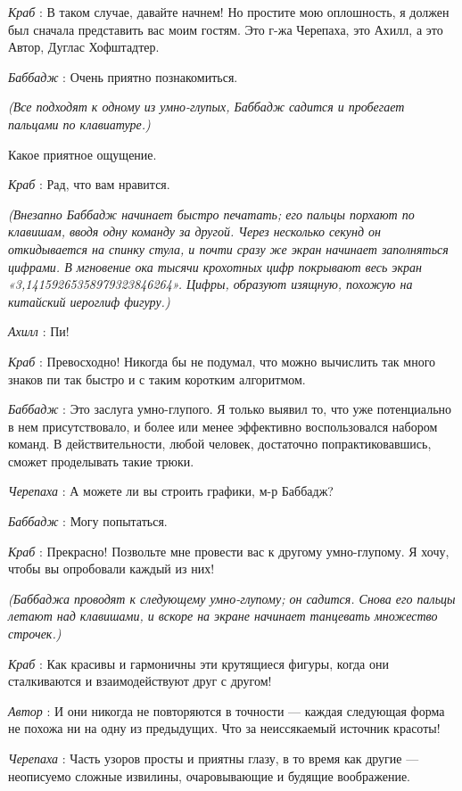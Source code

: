 \emph{Краб} : В таком случае, давайте начнем! Но простите мою оплошность, я должен был сначала представить вас моим гостям. Это г-жа Черепаха, это Ахилл, а это Автор, Дуглас Хофштадтер.

\emph{Баббадж} : Очень приятно познакомиться.

\emph{(Все подходят к одному из умно-глупых, Баббадж садится и пробегает пальцами по клавиатуре.)}

Какое приятное ощущение.

\emph{Краб} : Рад, что вам нравится.

\emph{(Внезапно Баббадж начинает быстро печатать; его пальцы порхают по клавишам, вводя одну команду за другой. Через несколько секунд он откидывается на спинку стула, и почти сразу же экран начинает заполняться цифрами. В мгновение ока тысячи крохотных цифр покрывают весь экран «3,14159265358979323846264». Цифры, образуют изящную, похожую на китайский иероглиф фигуру.)}

\emph{Ахилл} : Пи!

\emph{Краб} : Превосходно! Никогда бы не подумал, что можно вычислить так много знаков пи так быстро и с таким коротким алгоритмом.

\emph{Баббадж} : Это заслуга умно-глупого. Я только выявил то, что уже потенциально в нем присутствовало, и более или менее эффективно воспользовался набором команд. В действительности, любой человек, достаточно попрактиковавшись, сможет проделывать такие трюки.

\emph{Черепаха} : А можете ли вы строить графики, м-р Баббадж?

\emph{Баббадж} : Могу попытаться.

\emph{Краб} : Прекрасно! Позвольте мне провести вас к другому умно-глупому. Я хочу, чтобы вы опробовали каждый из них!

\emph{(Баббаджа проводят к следующему умно-глупому; он садится. Снова его пальцы летают над клавишами, и вскоре на экране начинает танцевать множество строчек.)}

\emph{Краб} : Как красивы и гармоничны эти крутящиеся фигуры, когда они сталкиваются и взаимодействуют друг с другом!

\emph{Автор} : И они никогда не повторяются в точности --- каждая следующая форма не похожа ни на одну из предыдущих. Что за неиссякаемый источник красоты!

\emph{Черепаха} : Часть узоров просты и приятны глазу, в то время как другие --- неописуемо сложные извилины, очаровывающие и будящие воображение.

